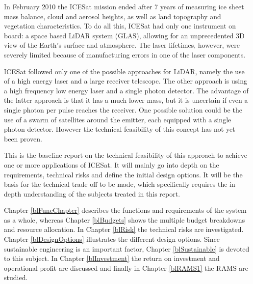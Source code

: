 In February 2010 the ICESat mission ended after 7 years of measuring ice sheet mass balance, cloud and aerosol heights, as well as land topography and vegetation characteristics.
To do all this, ICESat had only one instrument on board: a space based \ac{LiDAR} system (\ac{GLAS}), allowing for an unprecedented 3D view of the Earth's surface and atmosphere.
The laser lifetimes, however, were severely limited because of manufacturing errors in one of the laser components.

ICESat followed only one of the possible approaches for \ac{LiDAR}, namely the use of a high energy laser and a large receiver telescope. The other approach is using a high frequency low energy laser and a single photon detector. The advantage of the latter approach is that it has a much lower mass, but it is uncertain if even a single photon per pulse reaches the receiver. One possible solution could be the use of a swarm of satellites around the emitter, each equipped with a single photon detector. However the technical feasibility of this concept has not yet been proven.

This is the baseline report on the technical feasibility of this approach to achieve one or more applications of ICESat. It will mainly go into depth on the requirements, technical risks and define the initial design options. It will be the basis for the technical trade off to be made, which specifically requires the in-depth understanding of the subjects treated in this report.

Chapter \ref{blFuncChapter} describes the functions and requirements of the system as a whole, whereas Chapter \ref{blBudgets} shows the multiple budget breakdowns and resource allocation. In Chapter \ref{blRisk} the technical risks are investigated. Chapter \ref{blDesignOptions} illustrates the different design options. Since sustainable engineering is an important factor, Chapter \ref{blSustainable} is devoted to this subject. In Chapter \ref{blInvestment} the return on investment and operational profit are discussed and finally in Chapter \ref{blRAMS1} the \ac{RAMS} are studied.